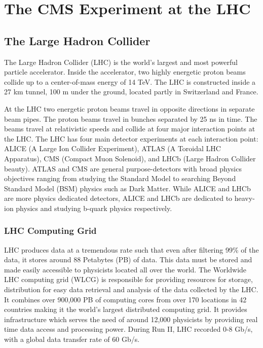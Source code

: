\chapter{The CMS Experiment at the LHC}
\label{chapter:three}
\section{The Large Hadron Collider}

The Large Hadron Collider (LHC) is the world’s largest and most powerful particle accelerator. Inside the accelerator, two highly energetic proton beams collide up to a center-of-mass energy of 14 TeV. The LHC is constructed inside a 27 km tunnel, 100 m under the ground, located partly in Switzerland and France.

At the LHC two energetic proton beams travel in opposite directions in separate beam pipes. The proton beams travel in bunches separated by 25 ns in time. The beams travel at relativistic speeds and collide at four major interaction points at the LHC. The LHC has four main detector experiments at each interaction point: ALICE (A Large Ion Collider Experiment), ATLAS (A Toroidal LHC Apparatus), CMS (Compact Muon Solenoid), and LHCb (Large Hadron Collider beauty). ATLAS and CMS are general purpose-detectors with broad physics objectives ranging from studying the Standard Model to searching Beyond Standard Model (BSM) physics such as Dark Matter. While ALICE and LHCb are more physics dedicated detectors, ALICE and LHCb are dedicated to heavy-ion physics and studying b-quark physics respectively.
\subsection{LHC Computing Grid}
LHC produces data at a tremendous rate such that even after filtering 99\% of the data, it stores around 88 Petabytes (PB) of data. This data must be stored and made easily accessible to physicists located all over the world. The Worldwide LHC computing grid (WLCG)  \cite{Molina:2014sia_wlcg} is responsible for providing resources for storage, distribution for easy data retrieval and analysis of the data collected by the LHC. It combines over 900,000 PB of computing cores from over 170 locations in 42 countries making it the world's largest distributed computing grid. It provides infrastructure which serves the need of around 12,000 physicists by providing real time data access and processing power. During Run II, LHC recorded  0-8 Gb/s, with a global data transfer rate of 60 Gb/s.  

